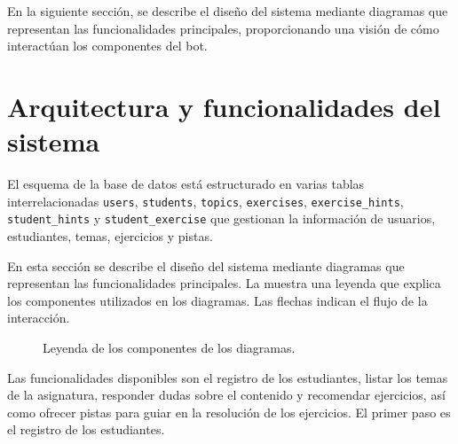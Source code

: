 En la siguiente sección, se describe el diseño del sistema mediante diagramas que representan las funcionalidades principales, proporcionando una visión de cómo interactúan los componentes del bot.

\section{Arquitectura y funcionalidades del sistema}\label{sec:features}

El esquema de la base de datos está estructurado en varias tablas interrelacionadas \texttt{users}, \texttt{students}, \texttt{topics}, \texttt{exercises}, \texttt{exercise\_hints}, \texttt{student\_hints} y \texttt{student\_exercise} que gestionan la información de usuarios, estudiantes, temas, ejercicios y pistas.

En esta sección se describe el diseño del sistema mediante diagramas que representan las funcionalidades principales. La  muestra una leyenda que explica los componentes utilizados en los diagramas. Las flechas indican el flujo de la interacción.

\begin{figure}[h!]
  \centering
      \caption{Leyenda de los componentes de los diagramas.}\label{fig:legend}
\end{figure}

Las funcionalidades disponibles son el registro de los estudiantes, listar los temas de la asignatura, responder dudas sobre el contenido y recomendar ejercicios, así como ofrecer pistas para guiar en la resolución de los ejercicios. El primer paso es el registro de los estudiantes.

